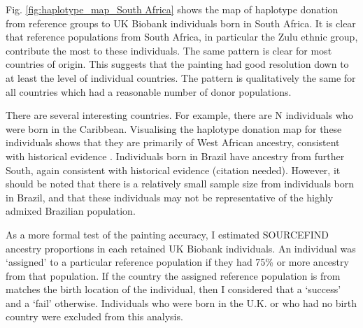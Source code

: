 Fig. \ref{fig:haplotype_map_South Africa} shows the map of haplotype donation from reference groups to UK Biobank individuals born in South Africa. It is clear that reference populations from South Africa, in particular the Zulu ethnic group, contribute the most to these individuals. The same pattern is clear for most countries of origin. This suggests that the painting had good resolution down to at least the level of individual countries. The pattern is qualitatively the same for all countries which had a reasonable number of donor populations. 

There are several interesting countries. For example, there are N individuals who were born in the Caribbean. Visualising the haplotype donation map for these individuals shows that they are primarily of West African ancestry, consistent with historical evidence \cite{micheletti2020genetic}. Individuals born in Brazil have ancestry from further South, again consistent with historical evidence (citation needed). However, it should be noted that there is a relatively small sample size from individuals born in Brazil, and that these individuals may not be representative of the highly admixed Brazilian population. 

As a more formal test of the painting accuracy, I estimated SOURCEFIND ancestry proportions in each retained UK Biobank individuals. An individual was `assigned' to a particular reference population if they had 75\% or more ancestry from that population. If the country the assigned reference population is from matches the birth location of the individual, then I considered that a `success' and a `fail' otherwise. Individuals who were born in the U.K. or who had no birth country were excluded from this analysis. 

